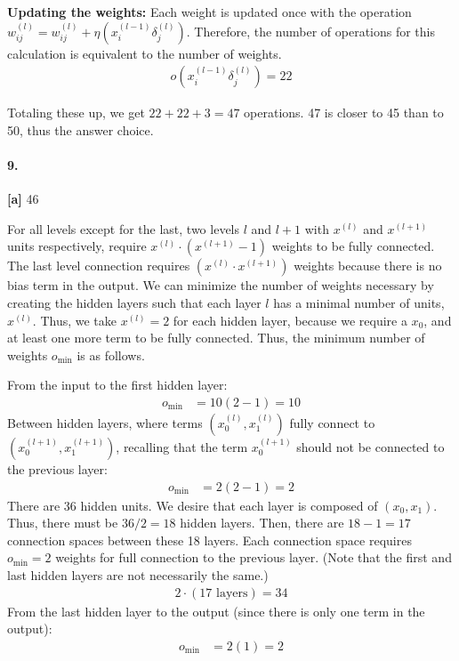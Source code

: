 \documentclass[10pt,letter]{article}
\begin{document}
	\textbf{Updating the weights:} Each weight is updated once with the operation $w_{ij}^{(l)} = w_{ij}^{(l)} + \eta(x_i^{(l-1)}\delta_j^{(l)})$. Therefore, the number of operations for this calculation is equivalent to the number of weights. 
	\begin{align*}
	o(x_i^{(l-1)}\delta_j^{(l)}) = 22
	\end{align*}

	Totaling these up, we get $22+22+3 = 47$ operations. 47 is closer to 45 than to 50, thus the answer choice.

\paragraph{9.} \textbf{[a]} 46
	
	For all levels except for the last, two levels $l$ and $l+1$ with $x^{(l)}$ and $x^{(l+1)}$ units respectively, require $x^{(l)}\cdot(x^{(l+1)}-1)$ weights to be fully connected. The last level connection requires $(x^{(l)}\cdot x^{(l+1)})$ weights because there is no bias term in the output. We can minimize the number of weights necessary by creating the hidden layers such that each layer $l$ has a minimal number of units, $x^{(l)}$. Thus, we take $x^{(l)} = 2$ for each hidden layer, because we require a $x_0$, and at least one more term to be fully connected. Thus, the minimum number of weights $o_{\text{min}}$ is as follows.

	From the input to the first hidden layer:
	\begin{align*}
	o_{\text{min}} &= 10(2 - 1) = 10 
	\end{align*}
	Between hidden layers, where terms $(x_0^{(l)}, x_1^{(l)})$ fully connect to $(x_0^{(l+1)}, x_1^{(l+1)})$, recalling that the term $x_0^{(l+1)}$ should not be connected to the previous layer:
	\begin{align*}
	o_{\text{min}} &= 2(2 - 1) = 2
	\end{align*}
	There are 36 hidden units. We desire that each layer is composed of $(x_0, x_1)$. Thus, there must be $36/2 = 18$ hidden layers. Then, there are $18 - 1 = 17$ connection spaces between these 18 layers. Each connection space requires $o_{\text{min}} = 2$ weights for full connection to the previous layer. (Note that the first and last hidden layers are not necessarily the same.)
	\begin{align*}
	2 \cdot (17 \text{ layers}) = 34 
	\end{align*}
	From the last hidden layer to the output (since there is only one term in the output):
	\begin{align*}
	o_{\text{min}} &= 2(1) = 2 
	\end{align*}
\end{document}
